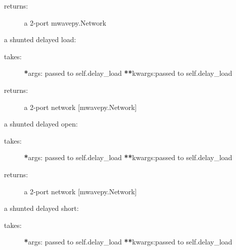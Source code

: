 \documentclass[letterpaper,10pt,english]{sphinxmanual}
\begin{document}
\begin{fulllineitems}
\begin{fulllineitems}
\begin{description}
\item[{returns:}] \leavevmode
a 2-port mwavepy.Network

\end{description}

\end{fulllineitems}


\begin{fulllineitems}
\label{api/mwavepy.media:mwavepy.media.media.Media.shunt_delay_load}
a shunted delayed load:
\begin{description}
\item[{takes:}] \leavevmode
{\color{red}\bfseries{}*}args: passed to self.delay\_load
{\color{red}\bfseries{}**}kwargs:passed to self.delay\_load

\item[{returns:}] \leavevmode
a 2-port network {[}mwavepy.Network{]}

\end{description}

\end{fulllineitems}


\begin{fulllineitems}
\label{api/mwavepy.media:mwavepy.media.media.Media.shunt_delay_open}
a shunted delayed open:
\begin{description}
\item[{takes:}] \leavevmode
{\color{red}\bfseries{}*}args: passed to self.delay\_load
{\color{red}\bfseries{}**}kwargs:passed to self.delay\_load

\item[{returns:}] \leavevmode
a 2-port network {[}mwavepy.Network{]}

\end{description}

\end{fulllineitems}


\begin{fulllineitems}
\label{api/mwavepy.media:mwavepy.media.media.Media.shunt_delay_short}
a shunted delayed short:
\begin{description}
\item[{takes:}] \leavevmode
{\color{red}\bfseries{}*}args: passed to self.delay\_load
{\color{red}\bfseries{}**}kwargs:passed to self.delay\_load


\end{description}
\end{fulllineitems}
\end{fulllineitems}
\end{document}
